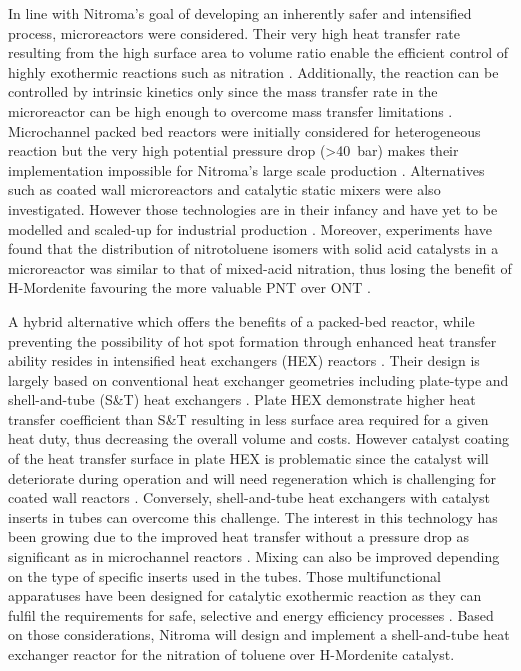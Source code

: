 In line with Nitroma's goal of developing an inherently safer and intensified process, microreactors were considered. Their very high heat transfer rate resulting from the high surface area to volume ratio enable the efficient control of highly exothermic reactions such as nitration \cite{halder_nitration_2007}. Additionally, the reaction can be controlled by intrinsic kinetics only since the mass transfer rate in the microreactor can be high enough to overcome mass transfer limitations \cite{halder_nitration_2007}. Microchannel packed bed reactors were initially considered for heterogeneous reaction but the very high potential pressure drop (\SI{>40}{\bar}) makes their implementation impossible for Nitroma's large scale production \cite{rebrov_microreactors_2016}. Alternatives such as coated wall microreactors and catalytic static mixers were also investigated. However those technologies are in their infancy and have yet to be modelled and scaled-up for industrial production \cite{lopes_regime_2013}. Moreover, experiments have found that the distribution of nitrotoluene isomers with solid acid catalysts in a microreactor was similar to that of mixed-acid nitration, thus losing the benefit of H-Mordenite favouring the more valuable PNT over ONT \cite{halder_nitration_2007}.


A hybrid alternative which offers the benefits of a packed-bed reactor, while preventing the possibility of hot spot formation through enhanced heat transfer ability resides in intensified heat exchangers (HEX) reactors \cite{di_miceli_raimondi_safety_2015}. Their design is largely based on conventional heat exchanger geometries including plate-type and shell-and-tube (S\&T) heat exchangers \cite{anxionnaz_heat_2008}. Plate HEX demonstrate higher heat transfer coefficient than S\&T resulting in less surface area required for a given heat duty, thus decreasing the overall volume and costs. However catalyst coating of the heat transfer surface in plate HEX is problematic since the catalyst will deteriorate during operation and will need regeneration which is challenging for coated wall reactors \cite{anxionnaz_heat_2008}. Conversely, shell-and-tube heat exchangers with catalyst inserts in tubes can overcome this challenge. The interest in this technology has been growing due to the improved heat transfer without a pressure drop as significant as in microchannel reactors \cite{griffin_heat_2001}. Mixing can also be improved depending on the type of specific inserts used in the tubes. Those multifunctional apparatuses have been designed for catalytic exothermic reaction as they can fulfil the requirements for safe, selective and energy efficiency processes \cite{anxionnaz_heat_2008}. Based on those considerations, Nitroma will design and implement a shell-and-tube heat exchanger reactor for the nitration of toluene over H-Mordenite catalyst.

